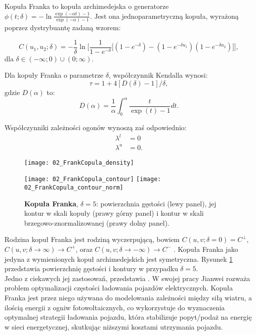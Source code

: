 \begin{df}
	Kopuła Franka to kopuła archimedejska o generatorze $\phi(t;\delta) = -\ln\frac{\exp(-\alpha t) - 1}{\exp(-\alpha)-1}$. Jest ona jednoparametryczną kopuła, wyrażoną poprzez dystrybuantę zadaną wzorem:
	
	$$ C(u_1, u_2; \delta) = -\frac{1}{\delta}\ln\bigg[ \frac{1}{1-e^{-\delta}}\big[(1-e^{-\delta}) - (1-e^{-\delta u_1})(1-e^{-\delta u_2})\big] \bigg],$$
	dla $\delta \in (-\infty; 0) \cup (0; \infty).$
\end{df}
\begin{prop}
	Dla kopuły Franka o parametrze $\delta$, współczynnik Kendalla wynosi:
	$$ \tau = 1 + 4[D(\delta) - 1]/\delta,$$
	gdzie $D(\alpha)$ to:
	$$ D(\alpha) = \frac{1}{\alpha} \int_{0}^{\alpha} \frac{t}{\exp(t) - 1}dt.$$
		
	Współczynniki zależności ogonów wynoszą zaś odpowiednio:
	\begin{equation}
		\begin{split}
			\lambda^{l}&=0\\
			\lambda^{u}&=0.
		\end{split}
	\end{equation}
\end{prop}

\begin{figure}[h]
	\centering
	\begin{minipage}{0.5\linewidth}
		\texttt{[image: 02\_FrankCopula\_density]}
	\end{minipage}
	\begin{minipage}{0.45\linewidth}
		\texttt{[image: 02\_FrankCopula\_contour]}
		\texttt{[image: 02\_FrankCopula\_contour\_norm]}
	\end{minipage}
	\caption{\textbf{Kopuła Franka}, $\delta = 5$: powierzchnia gęstości (lewy panel), jej kontur w skali kopuły (prawy górny panel) i kontur w skali brzegowo-znormalizowanej (prawy dolny panel). \label{fig:frank_copula_density}}
\end{figure}

Rodzina kopuł Franka jest rodziną wyczerpującą, bowiem $C(u,v;\delta = 0) = C^{\perp}$, $C(u,v;\delta \to \infty) \to C^{+}$, oraz $C(u,v;\delta \to -\infty) \to C^{-}$ . Kopuła Franka jako jedyna z wymienionych kopuł archimedejskich jest symetryczna. Rysunek \ref{fig:frank_copula_density} przedstawia powierzchnię gęstości i kontury w przypadku $\delta = 5$. \\
Jedno z ciekawych jej zastosowań, przedstawia \cite{Jianwei2021}. W swojej pracy Jianwei rozważa problem optymalizacji częstości ładowania pojazdów elektrycznych. Kopuła Franka jest przez niego używana do modelowania zależności między siłą wiatru, a ilością energii z ogniw fotowoltaicznych, co wykorzystuje do wyznaczenia optymalnej strategii ładowania pojazdu, która stabilizuje popyt/podaż na energię w sieci energetycznej, skutkując niższymi kosztami utrzymania pojazdu. 

